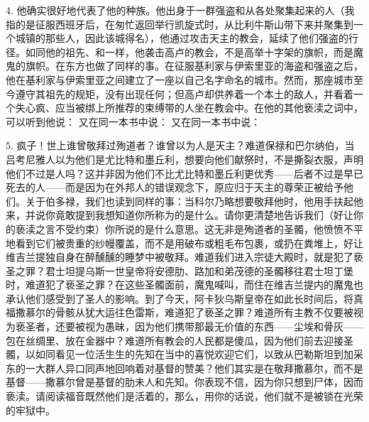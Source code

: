 4. 他确实很好地代表了他的种族。他出身于一群强盗和从各处聚集起来的人（我指的是征服西班牙后，在匆忙返回举行凯旋式时，从比利牛斯山带下来并聚集到一个城镇的那些人，因此该城得名），他通过攻击天主的教会，延续了他们强盗的行径。如同他的祖先、和一样，他袭击高卢的教会，不是高举十字架的旗帜，而是魔鬼的旗帜。在东方也做了同样的事。在征服基利家与伊索里亚的海盗和强盗之后，他在基利家与伊索里亚之间建立了一座以自己名字命名的城市。然而，那座城市至今遵守其祖先的规矩，没有出现任何；但高卢却供养着一个本土的敌人，并看着一个失心疯、应当被绑上所推荐的束缚带的人坐在教会中。在他的其他亵渎之词中，可以听到他说： 又在同一本书中说： 又在同一本书中说：\par

5. 疯子！世上谁曾敬拜过殉道者？谁曾以为人是天主？难道保禄和巴尔纳伯，当吕考尼雅人以为他们是尤比特和墨丘利，想要向他们献祭时，不是撕裂衣服，声明他们不过是人吗？这并非因为他们不比尤比特和墨丘利更优秀——后者不过是早已死去的人——而是因为在外邦人的错误观念下，原应归于天主的尊荣正被给予他们。关于伯多禄，我们也读到同样的事：当科尔乃略想要敬拜他时，他用手扶起他来，并说你竟敢提到我想知道你所称为的是什么。请你更清楚地告诉我们（好让你的亵渎之言不受约束）你所说的是什么意思。这无非是殉道者的圣髑，他愤愤不平地看到它们被贵重的纱幔覆盖，而不是用破布或粗毛布包裹，或扔在粪堆上，好让维吉兰提独自身在醉醺醺的睡梦中被敬拜。难道我们进入宗徒大殿时，就是犯了亵圣之罪？君士坦提乌斯一世皇帝将安德肋、路加和弟茂德的圣髑移往君士坦丁堡时，难道犯了亵圣之罪？在这些圣髑面前，魔鬼喊叫，而住在维吉兰提内的魔鬼也承认他们感受到了圣人的影响。到了今天，阿卡狄乌斯皇帝在如此长时间后，将真福撒慕尔的骨骸从犹大运往色雷斯，难道犯了亵圣之罪？难道所有主教不仅要被视为亵圣者，还要被视为愚昧，因为他们携带那最无价值的东西——尘埃和骨灰——包在丝绸里、放在金器中？难道所有教会的人民都是傻瓜，因为他们前去迎接圣髑，以如同看见一位活生生的先知在当中的喜悦欢迎它们，以致从巴勒斯坦到加采东的一大群人异口同声地回响着对基督的赞美？他们其实是在敬拜撒慕尔，而不是基督——撒慕尔曾是基督的肋未人和先知。你表现不信，因为你只想到尸体，因而亵渎。请阅读福音既然他们是活着的，那么，用你的话说，他们就不是被锁在光荣的牢狱中。\par


